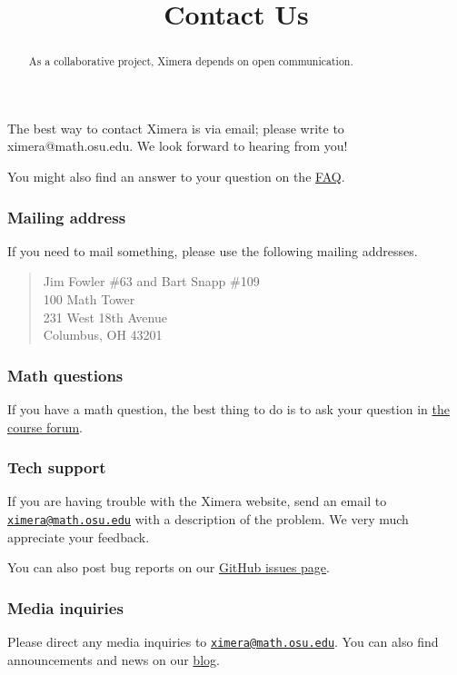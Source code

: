 \documentclass{ximera}
\title{Contact Us}
\begin{document}
\begin{abstract}
  As a collaborative project, Ximera depends on open communication.
\end{abstract}
\maketitle

The best way to contact Ximera is via email; please write to
ximera@math.osu.edu. We look forward to hearing from you!

You might also find an answer to your question on the
\href{/about/faq}{FAQ}.

\subsubsection{Mailing address}

If you need to mail something, please use the following mailing
addresses.
\begin{quote}
  Jim Fowler \#63 and Bart Snapp \#109 \\
  100 Math Tower \\
  231 West 18th Avenue \\
  Columbus, OH 43201
\end{quote}

\subsubsection{Math questions}\label{math-questions}

If you have a math question, the best thing to do is to ask your
question in \href{/courses}{the course forum}.

\subsubsection{Tech support}\label{tech-support}

If you are having trouble with the Ximera website, send an email to
\href{mailto:ximera@math.osu.edu}{\nolinkurl{ximera@math.osu.edu}} with
a description of the problem. We very much appreciate your feedback.

You can also post bug reports on our
\href{https://github.com/kisonecat/ximera/issues}{GitHub issues page}.

\subsubsection{Media inquiries}\label{media-inquiries}

Please direct any media inquiries to
\href{mailto:ximera@math.osu.edu}{\nolinkurl{ximera@math.osu.edu}}. You
can also find announcements and news on our \href{/blog}{blog}.
\end{document}
